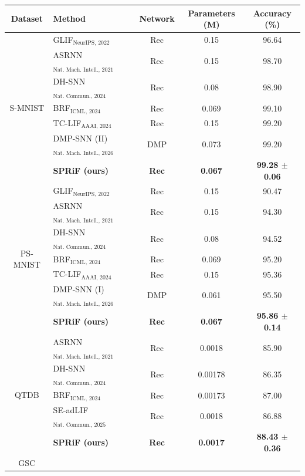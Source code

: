 \documentclass[letterpaper]{article} %
\begin{document}
\begin{table}[t]
\centering
\begin{tabular}{clccc}
\toprule
Dataset & Method & Network & Parameters (M) & Accuracy (\%) \\
\midrule
\multirow{7}{*}{S-MNIST}
& GLIF$_{\text{NeurIPS, 2022}}$~\cite{glif} & Rec & 0.15 & 96.64 \\
& ASRNN$_{\text{Nat. Mach. Intell., 2021}}$~\cite{asrnn} & Rec & 0.15 & 98.70 \\
& DH-SNN$_{\text{Nat. Commun., 2024}}$~\cite{dhsnn} & Rec & 0.08 & 98.90 \\
& BRF$_{\text{ICML, 2024}}$~\cite{brf} & Rec & 0.069 & 99.10 \\
& TC-LIF$_{\text{AAAI, 2024}}$~\cite{tclif} & Rec & 0.15 & 99.20 \\
& DMP-SNN (II)$_{\text{Nat. Mach. Intell., 2026}}$~\cite{sun2026dmp} & DMP & 0.073 & 99.20 \\
& \textbf{SPRiF (ours)} & \textbf{Rec} & \textbf{0.067} & \textbf{99.28 $\pm$ 0.06} \\
\midrule
\multirow{7}{*}{PS-MNIST}
& GLIF$_{\text{NeurIPS, 2022}}$~\cite{glif} & Rec & 0.15 & 90.47 \\
& ASRNN$_{\text{Nat. Mach. Intell., 2021}}$~\cite{asrnn} & Rec & 0.15 & 94.30 \\
& DH-SNN$_{\text{Nat. Commun., 2024}}$~\cite{dhsnn} & Rec & 0.08 & 94.52 \\
& BRF$_{\text{ICML, 2024}}$~\cite{brf} & Rec & 0.069 & 95.20 \\
& TC-LIF$_{\text{AAAI, 2024}}$~\cite{tclif} & Rec & 0.15 & 95.36 \\
& DMP-SNN (I)$_{\text{Nat. Mach. Intell., 2026}}$~\cite{sun2026dmp} & DMP & 0.061 & 95.50 \\
& \textbf{SPRiF (ours)} & \textbf{Rec} & \textbf{0.067} & \textbf{95.86 $\pm$ 0.14} \\
\midrule
\multirow{5}{*}{QTDB}
& ASRNN$_{\text{Nat. Mach. Intell., 2021}}$~\cite{asrnn} & Rec & 0.0018 & 85.90 \\
& DH-SNN$_{\text{Nat. Commun., 2024}}$~\cite{dhsnn} & Rec & 0.00178 & 86.35 \\
& BRF$_{\text{ICML, 2024}}$~\cite{brf} & Rec & 0.00173 & 87.00 \\
& SE-adLIF$_{\text{Nat. Commun., 2025}}$~\cite{adlif} & Rec & 0.0018 & 86.88 \\
& \textbf{SPRiF (ours)} & \textbf{Rec} & \textbf{0.0017} & \textbf{88.43 $\pm$ 0.36} \\
\midrule
\multirow{6}{*}{GSC}

\end{tabular}
\end{table}
\end{document}
